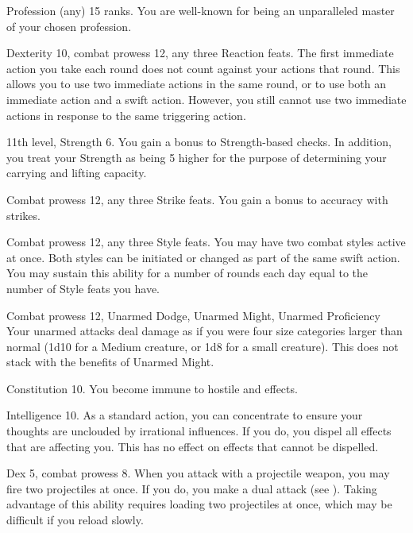 \featpre Profession (any) 15 ranks.
\featben You are well-known for being an unparalleled master of your chosen profession.

\featpres Dexterity 10, combat prowess 12, any three Reaction feats.
\featben The first immediate action you take each round does not count against your actions that round.
This allows you to use two immediate actions in the same round, or to use both an immediate action and a swift action.
However, you still cannot use two immediate actions in response to the same triggering action.

\featpres 11th level, Strength 6.
\featben You gain a  bonus to Strength-based checks.
In addition, you treat your Strength as being 5 higher for the purpose of determining your carrying and lifting capacity.

\featpres Combat prowess 12, any three Strike feats.
\featben You gain a  bonus to accuracy with strikes.

\featpres Combat prowess 12, any three Style feats.
\featben You may have two combat styles active at once.
Both styles can be initiated or changed as part of the same swift action.
You may sustain this ability for a number of rounds each day equal to the number of Style feats you have.


\featpres Combat prowess 12, Unarmed Dodge, Unarmed Might, Unarmed Proficiency
\featben Your unarmed attacks deal damage as if you were four size categories larger than normal (1d10 for a Medium creature, or 1d8 for a small creature).
This does not stack with the benefits of Unarmed Might.

\featpre Constitution 10.
\featben You become immune to hostile  and  effects.

\featpre Intelligence 10.
\featben As a standard action, you can concentrate to ensure your thoughts are unclouded by irrational influences.
If you do, you dispel all  effects that are affecting you.
This has no effect on effects that cannot be dispelled.

\featpres Dex 5, combat prowess 8.
\featben When you attack with a projectile weapon, you may fire two projectiles at once.
If you do, you make a dual attack (see ).
Taking advantage of this ability requires loading two projectiles at once, which may be difficult if you reload slowly.

